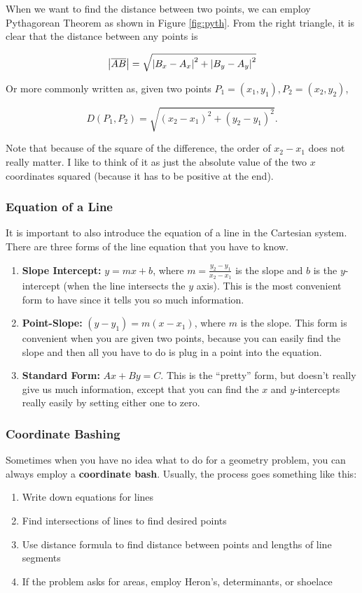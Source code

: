 When we want to find the distance between two points, we can employ Pythagorean Theorem as shown in Figure \ref{fig:pyth}. From the right triangle, it is clear that the distance between any points is

$$\abs{\overline{AB}}=\sqrt{\abs{B_x-A_x}^2+\abs{B_y-A_y}^2}$$

Or more commonly written as, given two points $P_1=(x_1,y_1),P_2=(x_2,y_2)$,

\begin{equation}
    \boxed{D(P_1,P_2)=\sqrt{(x_2-x_1)^2+(y_2-y_1)^2}}.
\end{equation}

Note that because of the square of the difference, the order of $x_2-x_1$ does not really matter. I like to think of it as just the absolute value of the two $x$ coordinates squared (because it has to be positive at the end).

\subsubsection{Equation of a Line}

It is important to also introduce the equation of a line in the Cartesian system. There are three forms of the line equation that you have to know. 

\begin{enumerate}
    \item \textbf{Slope Intercept:} $y = mx+b$, where $m=\frac{y_2-y_1}{x_2-x_1}$ is the slope and $b$ is the $y$-intercept (when the line intersects the $y$ axis). This is the most convenient form to have since it tells you so much information.
    \item \textbf{Point-Slope:} $(y-y_1)=m(x-x_1)$, where $m$ is the slope. This form is convenient when you are given two points, because you can easily find the slope and then all you have to do is plug in a point into the equation.
    \item \textbf{Standard Form:} $Ax+By=C$. This is the ``pretty'' form, but doesn't really give us much information, except that you can find the $x$ and $y$-intercepts really easily by setting either one to zero.
\end{enumerate}

\subsubsection{Coordinate Bashing}
Sometimes when you have no idea what to do for a geometry problem, you can always employ a \textbf{coordinate bash}. Usually, the process goes something like this:
\begin{enumerate}
    \item Write down equations for lines
    \item Find intersections of lines to find desired points
    \item Use distance formula to find distance between points and lengths of line segments
    \item If the problem asks for areas, employ Heron's, determinants, or shoelace 
\end{enumerate}


